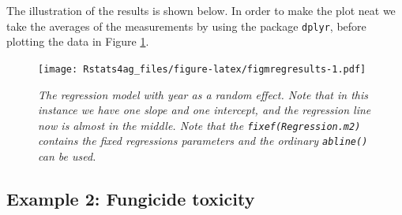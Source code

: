 \documentclass[letterpaper,]{book}
\newenvironment{Shaded}{\begin{snugshade}}{\end{snugshade}}
\newcommand{\CommentTok}[1]{\textcolor[rgb]{0.56,0.35,0.01}{\textit{#1}}}
\newcommand{\DataTypeTok}[1]{\textcolor[rgb]{0.13,0.29,0.53}{#1}}
\newcommand{\DecValTok}[1]{\textcolor[rgb]{0.00,0.00,0.81}{#1}}
\newcommand{\FloatTok}[1]{\textcolor[rgb]{0.00,0.00,0.81}{#1}}
\newcommand{\KeywordTok}[1]{\textcolor[rgb]{0.13,0.29,0.53}{\textbf{#1}}}
\newcommand{\NormalTok}[1]{#1}
\newcommand{\OperatorTok}[1]{\textcolor[rgb]{0.81,0.36,0.00}{\textbf{#1}}}
\newcommand{\StringTok}[1]{\textcolor[rgb]{0.31,0.60,0.02}{#1}}
\begin{document}
The illustration of the results is shown below. In order to make the plot neat we take the averages of the measurements by using the package \texttt{dplyr}, before plotting the data in Figure \ref{fig:figmregresults}.



\begin{Shaded}
\end{Shaded}

\begin{figure}
\centering
\texttt{[image: Rstats4ag\_files/figure-latex/figmregresults-1.pdf]}
\caption{\label{fig:figmregresults}\emph{The regression model with year as a random effect. Note that in this instance we have one slope and one intercept, and the regression line now is almost in the middle. Note that the \texttt{fixef(Regression.m2)} contains the fixed regressions parameters and the ordinary \texttt{abline()} can be used.}}
\end{figure}

\hypertarget{example-2-fungicide-toxicity}{%
\subsection{Example 2: Fungicide toxicity}\label{example-2-fungicide-toxicity}}
\end{document}
